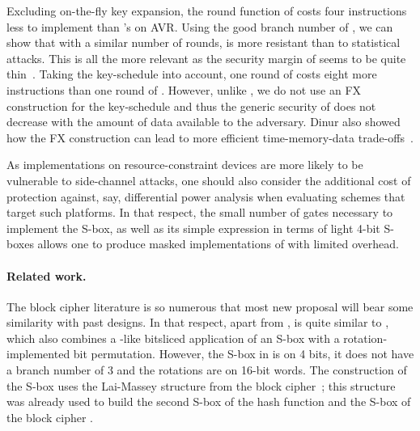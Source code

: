 Excluding on-the-fly key expansion, the round function of \fly costs four instructions less to implement than \pride's on AVR. Using the
good branch number of \littlunOne, we can show that with a similar number of rounds, \fly is more resistant than \pride
to statistical attacks. This is all the more relevant as the security margin of \pride seems to be quite
thin~\cite{prideattack}. Taking the key-schedule into account, one round of \fly costs eight more instructions
than one round of \pride. However, unlike \pride, we do not use an FX construction for the key-schedule and thus
the generic security of \fly does not decrease with the amount of data available
to the adversary. Dinur also showed how the FX construction can lead to more efficient time-memory-data trade-offs~\cite{itaitmd}.

As implementations on resource-constraint devices are more likely to be vulnerable to side-channel attacks, one should also consider
the additional cost of protection against, say, differential power analysis when evaluating schemes that target such platforms.
In that respect, the small number of gates
necessary to implement the \littlunOne S-box, as well as its simple expression in terms of light 4-bit S-boxes allows one to produce
masked implementations of \fly with limited overhead.

\paragraph{Related work.} The block cipher literature is so numerous that most new proposal will bear some similarity with past
designs. In that respect, apart from \present, \fly is quite similar to \rectangle \cite{rectangle}, which also combines a \serpent-like
bitsliced application of an S-box \cite{serpent} with a rotation-implemented bit permutation. However, the S-box in \rectangle is on 4 bits, it does
not have a branch number of 3 and the rotations are on 16-bit words. The construction of the \littlun S-box uses
the Lai-Massey structure from the \idea block cipher~\cite{idea}; this structure was already used to build the second S-box
of the \whirlpool hash function \cite{whirlpool} and the S-box of the block cipher \fox \cite{fox}.

